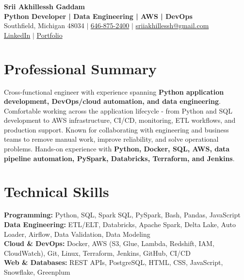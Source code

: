 \documentclass[letterpaper,10pt]{article}
\begin{document}
\fontsize{9.35pt}{10.45pt}\selectfont

\begin{center}
    {\LARGE \textbf{Srii Akhillessh Gaddam}} \\[-1pt]
    \textbf{Python Developer | Data Engineering | AWS | DevOps} \\[2pt]
    Southfield, Michigan 48034 $|$
    \href{tel:6468752400}{646-875-2400} $|$
    \href{mailto:sriiakhillessh@gmail.com}{sriiakhillessh@gmail.com} \\[1pt]
    \href{https://www.linkedin.com/in/srii-akhiilessh-gaddam-b48668191/}{LinkedIn} $|$
    \href{https://sriiakhillesshg.github.io/portfolio/}{Portfolio}
\end{center}
\vspace{-8pt}

\section{Professional Summary}
\small{Cross-functional engineer with experience spanning \textbf{Python application development, DevOps/cloud automation, and data engineering}. Comfortable working across the application lifecycle - from Python and SQL development to AWS infrastructure, CI/CD, monitoring, ETL workflows, and production support. Known for collaborating with engineering and business teams to remove manual work, improve reliability, and solve operational problems. Hands-on experience with \textbf{Python, Docker, SQL, AWS, data pipeline automation, PySpark, Databricks, Terraform, and Jenkins}.}

\section{Technical Skills}
\small{
\textbf{Programming:} Python, SQL, Spark SQL, PySpark, Bash, Pandas, JavaScript \\
\textbf{Data Engineering:} ETL/ELT, Databricks, Apache Spark, Delta Lake, Auto Loader, Airflow, Data Validation, Data Modeling \\
\textbf{Cloud \& DevOps:} Docker, AWS (S3, Glue, Lambda, Redshift, IAM, CloudWatch), Git, Linux, Terraform, Jenkins, GitHub, CI/CD \\
\textbf{Web \& Databases:} REST APIs, PostgreSQL, HTML, CSS, JavaScript, Snowflake, Greenplum
}
\end{document}
